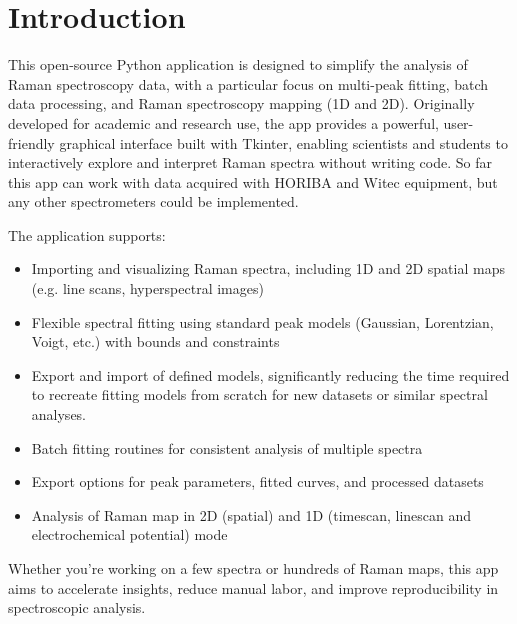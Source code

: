 \chapter{Introduction}
\label{cha:Introduction}


This open-source Python application is designed to simplify the analysis of Raman spectroscopy data, with a particular focus on multi-peak fitting, batch data processing, and Raman spectroscopy mapping (1D and 2D). Originally developed for academic and research use, the app provides a powerful, user-friendly graphical interface built with Tkinter, enabling scientists and students to interactively explore and interpret Raman spectra without writing code. So far this app can work with data acquired with HORIBA and Witec equipment, but any other spectrometers could be implemented.

The application supports:
\begin{itemize}
    \item Importing and visualizing Raman spectra, including 1D and 2D spatial maps (e.g. line scans, hyperspectral images)
    \item Flexible spectral fitting using standard peak models (Gaussian, Lorentzian, Voigt, etc.) with bounds and constraints
    \item Export and import of defined models, significantly reducing the time required to recreate fitting models from scratch for new datasets or similar spectral analyses.
    \item Batch fitting routines for consistent analysis of multiple spectra
    \item Export options for peak parameters, fitted curves, and processed datasets
    \item Analysis of Raman map in 2D (spatial) and 1D (timescan, linescan and electrochemical potential) mode
\end{itemize}

Whether you're working on a few spectra or hundreds of Raman maps, this app aims to accelerate insights, reduce manual labor, and improve reproducibility in spectroscopic analysis.